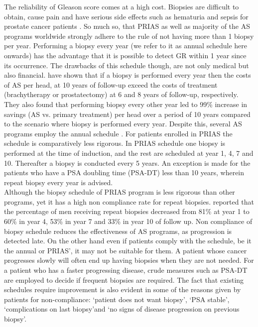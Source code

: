 The reliability of Gleason score comes at a high cost. Biopsies are difficult to obtain, cause pain and have serious side effects such as hematuria and sepsis for prostate cancer patients \citep{loeb2013systematic}. So much so, that PRIAS as well as majority of the AS programs worldwide strongly adhere to the rule of not having more than 1 biopsy per year. Performing a biopsy every year (we refer to it as annual schedule here onwards) has the advantage that it is possible to detect GR within 1 year since its occurrence. The drawbacks of this schedule though, are not only medical but also financial. \cite{keegan2012active} have shown that if a biopsy is performed every year then the costs of AS per head, at 10 years of follow-up exceed the costs of treatment (brachytherapy or prostatectomy) at 6 and 8 years of follow-up, respectively. They also found that performing biopsy every other year led to 99\% increase in savings (AS vs. primary treatment) per head over a period of 10 years compared to the scenario where biopsy is performed every year. Despite this, several AS programs employ the annual schedule \citep{tosoian2011active,welty2015extended}. For patients enrolled in PRIAS the schedule is comparatively less rigorous. In PRIAS schedule one biopsy is performed at the time of induction, and the rest are scheduled at year 1, 4, 7 and 10. Thereafter a biopsy is conducted every 5 years. An exception is made for the patients who have a PSA doubling time (PSA-DT) less than 10 years, wherein repeat biopsy every year is advised.\\

Although the biopsy schedule of PRIAS program is less rigorous than other programs, yet it has a high non compliance rate for repeat biopsies. \cite{bokhorst2015compliance} reported that the percentage of men receiving repeat biopsies decreased from 81\% at year 1 to 60\% in year 4, 53\% in year 7 and 33\% in year 10 of follow up. Non compliance of biopsy schedule reduces the effectiveness of AS programs, as progression is detected late. On the other hand even if patients comply with the schedule, be it the annual or PRIAS', it may not be suitable for them. A patient whose cancer progresses slowly will often end up having biopsies when they are not needed. For a patient who has a faster progressing disease, crude measures such as PSA-DT are employed to decide if frequent biopsies are required. The fact that existing schedules require improvement is also evident in some of the reasons given by patients for non-compliance:  \textquoteleft patient does not want biopsy\textquoteright, \textquoteleft PSA stable\textquoteright, \textquoteleft complications on last biopsy\textquoteright and \textquoteleft no signs of disease progression on previous biopsy\textquoteright.\\ 

